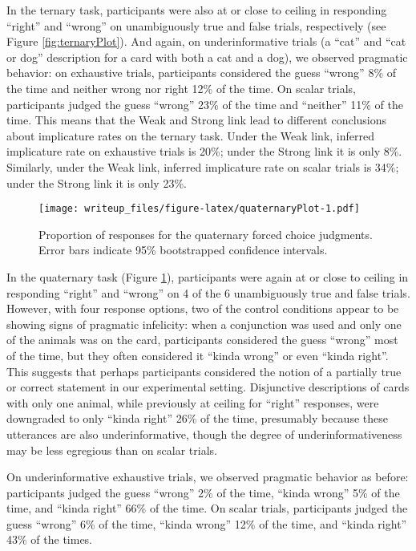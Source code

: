 \documentclass[man]{apa6}
\theoremstyle{definition}
\theoremstyle{definition}
\theoremstyle{definition}
\theoremstyle{remark}
\begin{document}
In the ternary task, participants were also at or close to ceiling in
responding \enquote{right} and \enquote{wrong} on unambiguously true and
false trials, respectively (see Figure \ref{fig:ternaryPlot}). And
again, on underinformative trials (a \enquote{cat} and \enquote{cat or
dog} description for a card with both a cat and a dog), we observed
pragmatic behavior: on exhaustive trials, participants considered the
guess \enquote{wrong} 8\% of the time and neither wrong nor right 12\%
of the time. On scalar trials, participants judged the guess
\enquote{wrong} 23\% of the time and \enquote{neither} 11\% of the time.
This means that the Weak and Strong link lead to different conclusions
about implicature rates on the ternary task. Under the Weak link,
inferred implicature rate on exhaustive trials is 20\%; under the Strong
link it is only 8\%. Similarly, under the Weak link, inferred
implicature rate on scalar trials is 34\%; under the Strong link it is
only 23\%.

\begin{figure}
\centering
\texttt{[image: writeup\_files/figure-latex/quaternaryPlot-1.pdf]}
\caption{\label{fig:quaternaryPlot}Proportion of responses for the
quaternary forced choice judgments. Error bars indicate 95\%
bootstrapped confidence intervals.}
\end{figure}

In the quaternary task (Figure \ref{fig:quaternaryPlot}), participants
were again at or close to ceiling in responding \enquote{right} and
\enquote{wrong} on 4 of the 6 unambiguously true and false trials.
However, with four response options, two of the control conditions
appear to be showing signs of pragmatic infelicity: when a conjunction
was used and only one of the animals was on the card, participants
considered the guess \enquote{wrong} most of the time, but they often
considered it \enquote{kinda wrong} or even \enquote{kinda right}. This
suggests that perhaps participants considered the notion of a partially
true or correct statement in our experimental setting. Disjunctive
descriptions of cards with only one animal, while previously at ceiling
for \enquote{right} responses, were downgraded to only \enquote{kinda
right} 26\% of the time, presumably because these utterances are also
underinformative, though the degree of underinformativeness may be less
egregious than on scalar trials.

On underinformative exhaustive trials, we observed pragmatic behavior as
before: participants judged the guess \enquote{wrong} 2\% of the time,
\enquote{kinda wrong} 5\% of the time, and \enquote{kinda right} 66\% of
the time. On scalar trials, participants judged the guess
\enquote{wrong} 6\% of the time, \enquote{kinda wrong} 12\% of the time,
and \enquote{kinda right} 43\% of the times.
\end{document}
